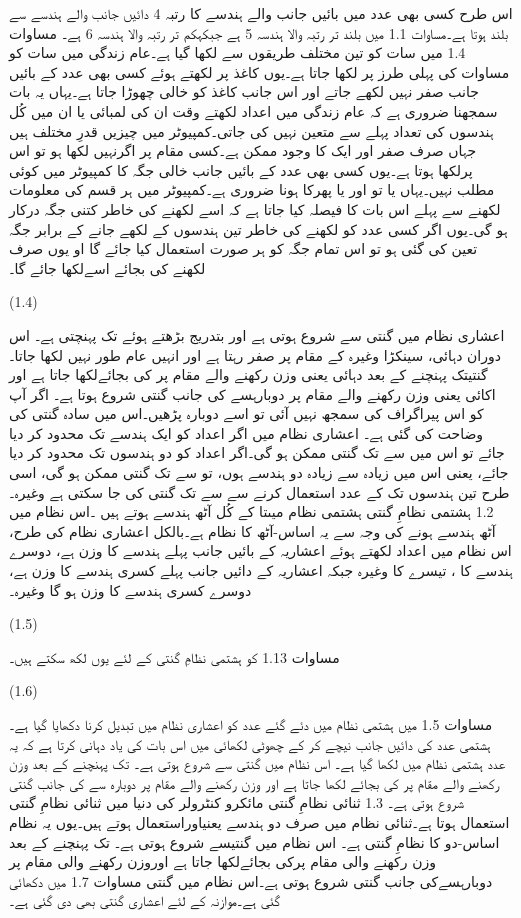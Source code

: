 	اس طرح کسی بھی عدد میں بائیں جانب والے ہندسے کا رتبہ 4 دائیں جانب والے ہندسے سے بلند ہوتا ہے۔مساوات 1.1 میں بلند تر رتبہ والا ہندسہ 5 ہے جبکہکم تر رتبہ والا ہندسہ 6 ہے۔
	مساوات 1.4 میں سات کو تین مختلف طریقوں سے لکھا گیا ہے۔عام زندگی میں سات کو مساوات کی پہلی طرز پر لکھا جاتا ہے۔یوں کاغذ پر لکھتے ہوئے کسی بھی عدد کے بائیں جانب صفر نہیں لکھے جاتے اور اس جانب کاغذ کو خالی چھوڑا جاتا ہے۔یہاں یہ بات سمجھنا ضروری ہے کہ عام زندگی میں اعداد لکھتے وقت ان کی لمبائی یا ان میں کُل ہندسوں کی تعداد پہلے سے متعین نہیں کی جاتی۔کمپیوٹر میں چیزیں قدرِ مختلف ہیں جہاں صرف صفر اور ایک کا وجود ممکن ہے۔کسی مقام پر اگرنہیں لکھا ہو تو اس پرلکھا ہوتا ہے۔یوں کسی بھی عدد کے بائیں جانب خالی جگہ کا کمپیوٹر میں کوئی مطلب نہیں۔یہاں یا تو اور یا پھرکا ہونا ضروری ہے۔کمپیوٹر میں ہر قسم کی معلومات لکھنے سے پہلے اس بات کا فیصلہ کیا جاتا ہے کہ اسے لکھنے کی خاطر کتنی جگہ  درکار ہو گی۔یوں اگر کسی عدد کو لکھنے کی خاطر تین ہندسوں کے لکھے جانے کے برابر جگہ تعین کی گئی ہو تو اس تمام جگہ کو ہر صورت استعمال کیا جائے گا او یوں صرف  لکھنے کی بجائے اسےلکھا جائے گا۔

 
(1.4)

	اعشاری نظام میں گنتی   سے شروع ہوتی ہے اور بتدریج بڑھتے ہوئے  تک پہنچتی ہے۔ اس دوران دہائی، سینکڑا وغیرہ کے مقام پر صفر رہتا ہے اور انہیں عام طور نہیں لکھا جاتا۔گنتیتک پہنچنے کے بعد دہائی یعنی  وزن رکھنے والے مقام پر  کی بجائےلکھا جاتا ہے اور اکائی یعنی  وزن رکھنے والے مقام پر دوبارہسے کی جانب گنتی شروع ہوتا ہے۔ 
	اگر آپ کو اس پیراگراف کی سمجھ نہیں آئی تو اسے دوبارہ پڑھیں۔اس میں سادہ گنتی کی وضاحت کی گئی ہے۔ 
	اعشاری نظام میں اگر اعداد کو ایک ہندسے تک محدود کر دیا جائے تو اس میں  سے   تک گنتی ممکن ہو گی۔اگر اعداد کو دو ہندسوں تک محدود کر دیا جائے، یعنی اس میں زیادہ سے زیادہ دو ہندسے ہوں، تو  سے   تک گنتی ممکن ہو گی، اسی طرح  تین ہندسوں تک کے عدد استعمال کرنے سے   سے تک گنتی کی جا سکتی ہے وغیرہ۔ 
1.2 ہشتمی نظامِ گنتی
	ہشتمی نظام میںتا کے کُل آٹھ ہندسے ہوتے ہیں ۔اس  نظام میں آٹھ ہندسے ہونے کی وجہ سے یہ اساس-آٹھ  کا نظام ہے۔بالکل اعشاری نظام کی طرح، اس نظام میں اعداد لکھتے ہوئے اعشاریہ کے بائیں جانب پہلے ہندسے  کا وزن  ہے، دوسرے ہندسے کا  ، تیسرے کا  وغیرہ جبکہ اعشاریہ کے دائیں جانب پہلے کسری ہندسے کا وزن ہے، دوسرے  کسری ہندسے کا وزن ہو گا وغیرہ۔

 
(1.5)

	مساوات 1.13 کو ہشتمی نظامِ گنتی کے لئے یوں لکھ سکتے ہیں۔

 
(1.6)

	مساوات 1.5 میں ہشتمی نظام میں دئے گئے عدد کو اعشاری نظام میں تبدیل کرنا دکھایا گیا ہے۔ہشتمی عدد کی دائیں جانب نیچے کر کے چھوٹی لکھائی میں اس بات کی یاد دہانی کرتا ہے کہ یہ عدد ہشتمی نظام میں لکھا گیا ہے۔ 
	اس نظام میں گنتی  سے شروع ہوتی ہے۔ تک پہنچنے کے  بعد   وزن رکھنے والے مقام پر  کی بجائے  لکھا جاتا ہے اور وزن رکھنے والے مقام پر دوبارہ  سے   کی جانب گنتی شروع ہوتی ہے۔
1.3 ثنائی نظامِ گنتی
	مائکرو کنٹرولر کی دنیا میں ثنائی نظامِ گنتی استعمال ہوتا ہے۔ثنائی نظام میں صرف دو ہندسے یعنیاوراستعمال ہوتے ہیں۔یوں یہ نظام اساس-دو کا نظامِ گنتی ہے۔
	اس نظام میں گنتیسے شروع ہوتی ہے۔ تک پہنچنے کے بعد   وزن رکھنے  والی مقام پرکی بجائےلکھا جاتا ہے اوروزن رکھنے والی مقام پر دوبارہسےکی جانب گنتی شروع ہوتی ہے۔اس نظام میں گنتی مساوات 1.7 میں دکھائی گئی ہے۔موازنہ کے لئے اعشاری گنتی بھی دی گئی ہے۔

